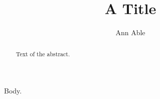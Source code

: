 \documentclass{aomart}
\title{A Title}
\author{Ann Able}
\begin{document}
\begin{abstract}
Text of the abstract.
\end{abstract}
\maketitle
Body.
\end{document}
